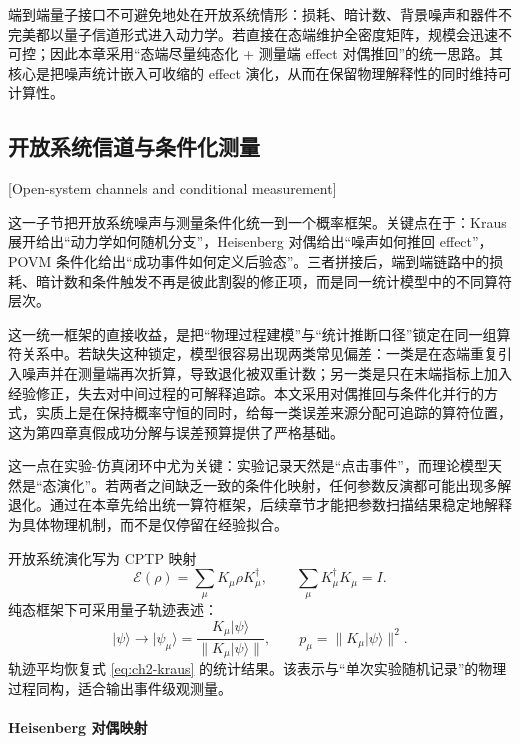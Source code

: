 端到端量子接口不可避免地处在开放系统情形：损耗、暗计数、背景噪声和器件不完美都以量子信道形式进入动力学。若直接在态端维护全密度矩阵，规模会迅速不可控；因此本章采用“态端尽量纯态化 + 测量端 effect 对偶推回”的统一思路。其核心是把噪声统计嵌入可收缩的 effect 演化，从而在保留物理解释性的同时维持可计算性。

\subsection{开放系统信道与条件化测量}[Open-system channels and conditional measurement]

这一子节把开放系统噪声与测量条件化统一到一个概率框架。关键点在于：Kraus 展开给出“动力学如何随机分支”，Heisenberg 对偶给出“噪声如何推回 effect”，POVM 条件化给出“成功事件如何定义后验态”。三者拼接后，端到端链路中的损耗、暗计数和条件触发不再是彼此割裂的修正项，而是同一统计模型中的不同算符层次。

这一统一框架的直接收益，是把“物理过程建模”与“统计推断口径”锁定在同一组算符关系中。若缺失这种锁定，模型很容易出现两类常见偏差：一类是在态端重复引入噪声并在测量端再次折算，导致退化被双重计数；另一类是只在末端指标上加入经验修正，失去对中间过程的可解释追踪。本文采用对偶推回与条件化并行的方式，实质上是在保持概率守恒的同时，给每一类误差来源分配可追踪的算符位置，这为第四章真假成功分解与误差预算提供了严格基础。

这一点在实验-仿真闭环中尤为关键：实验记录天然是“点击事件”，而理论模型天然是“态演化”。若两者之间缺乏一致的条件化映射，任何参数反演都可能出现多解退化。通过在本章先给出统一算符框架，后续章节才能把参数扫描结果稳定地解释为具体物理机制，而不是仅停留在经验拟合。

开放系统演化写为 CPTP 映射
\begin{equation}
\mathcal{E}(\rho)=\sum_{\mu}K_\mu \rho K_\mu^\dagger,\qquad
\sum_{\mu}K_\mu^\dagger K_\mu=I.
\label{eq:ch2-kraus}
\end{equation}
纯态框架下可采用量子轨迹表述：
\begin{equation}
|\psi\rangle\rightarrow
|\psi_\mu\rangle=\frac{K_\mu|\psi\rangle}{\|K_\mu|\psi\rangle\|},
\qquad
p_\mu=\|K_\mu|\psi\rangle\|^2.
\end{equation}
轨迹平均恢复式 \eqref{eq:ch2-kraus} 的统计结果。该表示与“单次实验随机记录”的物理过程同构，适合输出事件级观测量。

\paragraph{Heisenberg 对偶映射}

